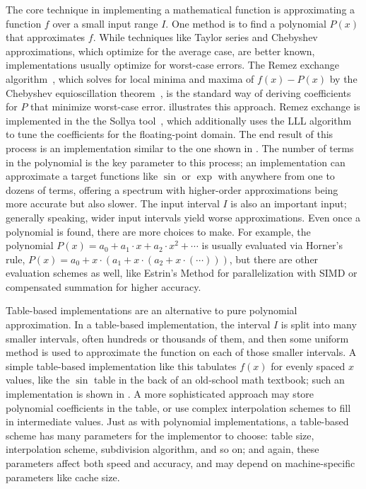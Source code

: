 \documentclass[paper.tex]{subfiles}
\begin{document}
The core technique in implementing a mathematical function
  is approximating a function $f$ over a small input range $I$.
One method is to find a polynomial $P(x)$ that approximates $f$.
While techniques like Taylor series and Chebyshev approximations,
  which optimize for the average case, are better known,
  implementations usually optimize for worst-case errors.
The Remez exchange algorithm~\cite{remez},
  which solves for local minima and maxima of $f(x) - P(x)$
  by the Chebyshev equioscillation theorem~\cite{equioscillation},
  is the standard way of deriving coefficients for $P$
  that minimize worst-case error.
 illustrates this approach.
Remez exchange is implemented in the the Sollya tool~\cite{sollya},
  which additionally uses the LLL algorithm~\cite{lll}
  to tune the coefficients for the floating-point domain.
The end result of this process is an implementation
  similar to the one shown in .
The number of terms in the polynomial is the key parameter to this process;
  an implementation can approximate a target functions like $\sin$ or $\exp$
  with anywhere from one to dozens of terms,
  offering a spectrum with higher-order approximations
  being more accurate but also slower.
The input interval $I$ is also an important input;
  generally speaking, wider input intervals yield worse approximations.
Even once a polynomial is found, there are more choices to make.
For example, the polynomial
\(
  P(x) = a_0 + a_1 \cdot x + a_2 \cdot x^2 + \dotsb
\)
is usually evaluated via Horner's rule,
\(
  P(x) = a_0 + x\cdot(a_1 + x\cdot(a_2 + x\cdot(\dotsb)))
\),
  but there are other evaluation schemes as well,
  like Estrin’s Method for parallelization with SIMD
  or compensated summation for higher accuracy.

Table-based implementations are an alternative to pure polynomial approximation.
In a table-based implementation,
  the interval $I$ is split into many smaller intervals,
  often hundreds or thousands of them,
  and then some uniform method is used to approximate the function
  on each of those smaller intervals.
A simple table-based implementation like this
  tabulates $f(x)$ for evenly spaced $x$ values,
  like the $\sin$ table in the back of an old-school math textbook;
  such an implementation is shown in .
A more sophisticated approach
  may store polynomial coefficients in the table,
  or use complex interpolation schemes to fill in intermediate values.
Just as with polynomial implementations,
  a table-based scheme has many parameters for the implementor to choose:
  table size, interpolation scheme, subdivision algorithm, and so on;
  and again, these parameters affect both speed and accuracy,
  and may depend on machine-specific parameters like cache size.
\end{document}
